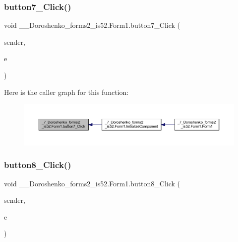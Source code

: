 \subsubsection{\texorpdfstring{button7\+\_\+\+Click()}{button7\_Click()}}
{\footnotesize\ttfamily void \+\_\+\_\+\+Doroshenko\+\_\+forms2\+\_\+is52.\+Form1.\+button7\+\_\+\+Click (\begin{DoxyParamCaption}\item[{object}]{sender,  }\item[{Event\+Args}]{e }\end{DoxyParamCaption})\hspace{0.3cm}{\ttfamily [private]}}

Here is the caller graph for this function\+:
\nopagebreak
\begin{figure}[H]
\begin{center}
\leavevmode
\includegraphics[width=350pt]{class__7___doroshenko__forms2__is52_1_1_form1_a08472aa69ab87aa28be496f75ef61c8f_icgraph}
\end{center}
\end{figure}
\hypertarget{class__7___doroshenko__forms2__is52_1_1_form1_a35447b2c82b039f1052e0db60b265d29}{}\label{class__7___doroshenko__forms2__is52_1_1_form1_a35447b2c82b039f1052e0db60b265d29} 
\subsubsection{\texorpdfstring{button8\+\_\+\+Click()}{button8\_Click()}}
{\footnotesize\ttfamily void \+\_\+\_\+\+Doroshenko\+\_\+forms2\+\_\+is52.\+Form1.\+button8\+\_\+\+Click (\begin{DoxyParamCaption}\item[{object}]{sender,  }\item[{Event\+Args}]{e }\end{DoxyParamCaption})\hspace{0.3cm}{\ttfamily [private]}}


